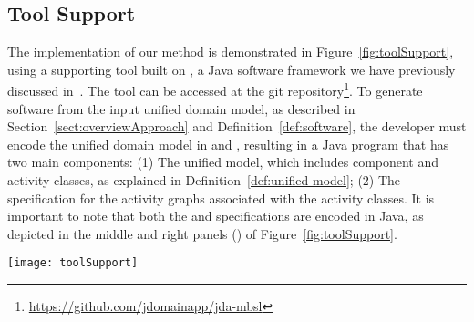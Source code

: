\subsection{Tool Support}
\label{subsect:toolSupport} %


The implementation of our method is demonstrated in Figure~\ref{fig:toolSupport}, using a supporting tool built on \jdomainapp, a Java software framework we have previously discussed in~\cite{le_domain_2018}. The tool can be accessed at the git repository\footnote{\url{https://github.com/jdomainapp/jda-mbsl}}.
%
To generate software from the input uniﬁed domain model, as described in Section~\ref{sect:overviewApproach} and Deﬁnition~\ref{def:software}, the developer must encode the uniﬁed domain model in \dcsl and \agl, resulting in a Java program that has two main components: (1) The \dcsl uniﬁed model, which includes component and activity classes, as explained in Deﬁnition~\ref{def:unified-model}; (2) The \agl specification for the activity graphs associated with the activity classes. It is important to note that both the \dcsl and \agl specifications are encoded in Java, as depicted in the middle and right panels (\resp) of Figure~\ref{fig:toolSupport}.

\begin{figure*}[ht]
	\centering
	\texttt{[image: toolSupport]}
	\caption{Illustration for the JDomainApp-based realization and usability of \agl.} %
	\vspace{-0.2cm}
	\label{fig:toolSupport}
\end{figure*}

